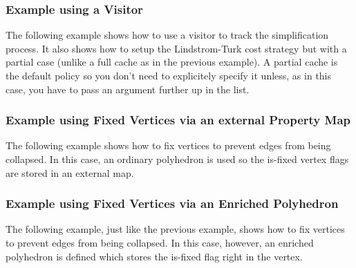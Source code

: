 \subsubsection{Example using a Visitor}

The following example shows how to use a visitor to track the simplification process. It also shows how to setup the Lindstrom-Turk cost strategy but with a partial case (unlike a full cache as in the previous example). A partial cache is the default policy so you don't need to explicitely specify it unless, as in this case, you have to pass an argument further up in the list.



\subsubsection{Example using Fixed Vertices via an external Property Map}

The following example shows how to fix vertices to prevent edges from being collapsed. In this case, an ordinary polyhedron is used so the is-fixed vertex flags are stored in an external map.


\subsubsection{Example using Fixed Vertices via an Enriched Polyhedron}

The following example, just like the previous example, shows how to fix vertices to prevent edges from being collapsed. In this case, however, an enriched polyhedron is defined which stores the is-fixed flag right in the vertex.




